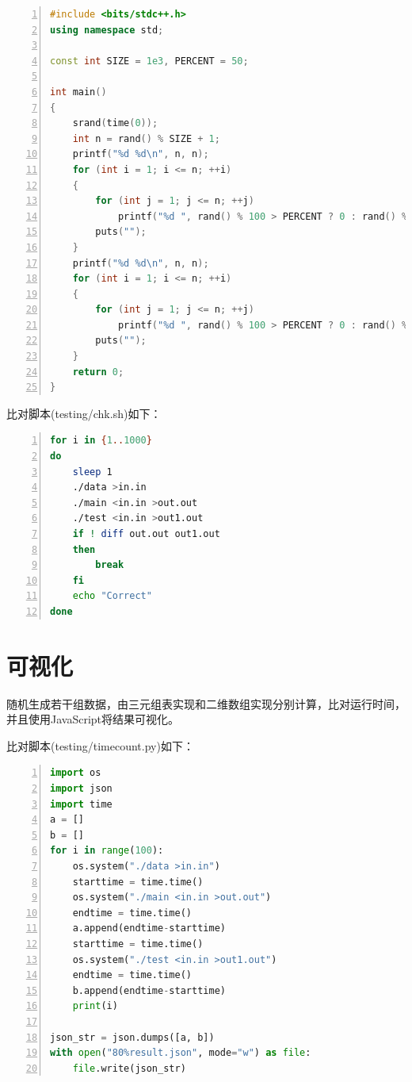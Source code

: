 \documentclass{article}
\begin{document}
\begin{lstlisting}[language={C++},
    numbers=left,
    numberstyle=\tiny\consolas,
    basicstyle=\small\consolas]
#include <bits/stdc++.h>
using namespace std;

const int SIZE = 1e3, PERCENT = 50;

int main()
{
    srand(time(0));
    int n = rand() % SIZE + 1;
    printf("%d %d\n", n, n);
    for (int i = 1; i <= n; ++i)
    {
        for (int j = 1; j <= n; ++j)
            printf("%d ", rand() % 100 > PERCENT ? 0 : rand() % 1000 + 1);
        puts("");
    }
    printf("%d %d\n", n, n);
    for (int i = 1; i <= n; ++i)
    {
        for (int j = 1; j <= n; ++j)
            printf("%d ", rand() % 100 > PERCENT ? 0 : rand() % 1000 + 1);
        puts("");
    }
    return 0;
}
\end{lstlisting}

比对脚本(testing/chk.sh)如下：

\begin{lstlisting}[language={bash},
    numbers=left,
    numberstyle=\tiny\consolas,
    basicstyle=\small\consolas]
for i in {1..1000}
do
    sleep 1
    ./data >in.in
    ./main <in.in >out.out
    ./test <in.in >out1.out
    if ! diff out.out out1.out
    then
        break
    fi
    echo "Correct"
done
\end{lstlisting}

\section{可视化}

随机生成若干组数据，由三元组表实现和二维数组实现分别计算，比对运行时间，并且使用JavaScript将结果可视化。

比对脚本(testing/timecount.py)如下：

\begin{lstlisting}[language={python},
    numbers=left,
    numberstyle=\tiny\consolas,
    basicstyle=\small\consolas]
import os
import json
import time
a = []
b = []
for i in range(100):
    os.system("./data >in.in")
    starttime = time.time()
    os.system("./main <in.in >out.out")
    endtime = time.time()
    a.append(endtime-starttime)
    starttime = time.time()
    os.system("./test <in.in >out1.out")
    endtime = time.time()
    b.append(endtime-starttime)
    print(i)

json_str = json.dumps([a, b])
with open("80%result.json", mode="w") as file:
    file.write(json_str)
\end{lstlisting}
\end{document}
